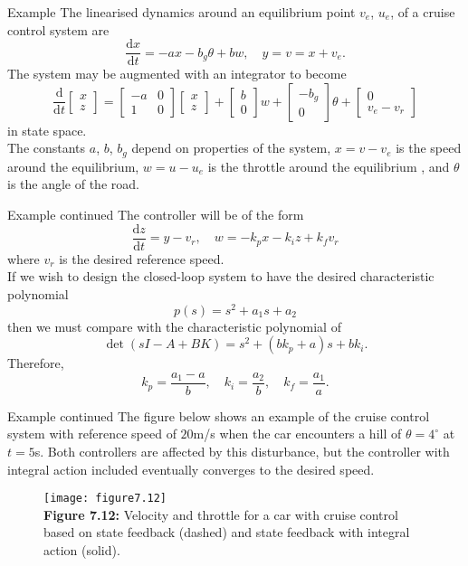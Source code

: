\documentclass{beamer-control}
\begin{document}
\begin{frame}{Example}
The linearised dynamics around an equilibrium point $v_e$, $u_e$, of a cruise control system are 
\[\frac{\mathrm{d}x}{\mathrm{d} t} = -ax-b_g\theta +bw, \quad y=v=x+v_e.\]
The system may be augmented with an integrator to become
\[\frac{\mathrm{d}}{\mathrm{d}t} \begin{bmatrix}
	x \\ z
\end{bmatrix} = \begin{bmatrix}
-a & 0 \\ 1 & 0
\end{bmatrix}  \begin{bmatrix}
x \\ z
\end{bmatrix} +  \begin{bmatrix}
b \\ 0
\end{bmatrix} w +  \begin{bmatrix}
-b_g\\ 0
\end{bmatrix} \theta +  \begin{bmatrix}
0 \\ v_e-v_r
\end{bmatrix}\]
in state space.\\
The constants $a$, $b$, $b_g$ depend on properties of the system, $x=v-v_e$ is the speed around the equilibrium, $w=u-u_e$ is the throttle around the equilibrium , and $\theta$ is the angle of the road.
\end{frame}

\begin{frame}{Example continued}
The controller will be of the form 
\[\frac{\mathrm{d}z}{\mathrm{d}t} = y-v_r, \quad w=-k_px-k_iz+k_fv_r\]
where $v_r$ is the desired reference speed.\\
If we wish to design the closed-loop system to have the desired characteristic polynomial
\[p(s)=s^2+a_1s+a_2\]
then we must compare with the characteristic polynomial of 
\[\operatorname{det}(sI-A+BK) = s^2+(bk_p+a)s+bk_i.\]
Therefore, 
\[k_p=\frac{a_1-a}{b}, \quad k_i=\frac{a_2}{b}, \quad k_f=\frac{a_1}{a}.\]
\end{frame}

\begin{frame}{Example continued}
The figure below shows an example of the cruise control system with reference speed of $20$m/s when the car encounters a hill of $\theta=4^\circ$ at $t=5$s. Both controllers are affected by this disturbance, but the controller with integral action included eventually converges to the desired speed.
\begin{figure}
	\centering
	\texttt{[image: figure7.12]}
	\\
	\textbf{Figure 7.12:} Velocity and throttle for a car with cruise control based on state feedback (dashed) and state feedback with integral action (solid).
\end{figure}
\end{frame}
\end{document}
